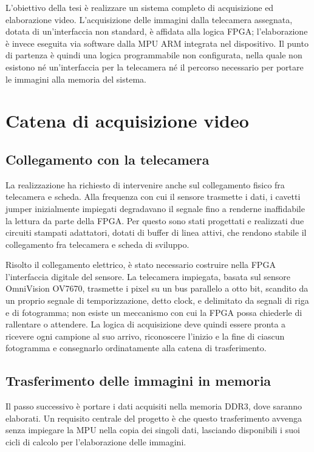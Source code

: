 L'obiettivo della tesi è realizzare un sistema completo di acquisizione ed elaborazione video. L'acquisizione delle immagini dalla telecamera assegnata, dotata di un'interfaccia non standard, è affidata alla logica FPGA; l'elaborazione è invece eseguita via software dalla MPU ARM integrata nel dispositivo. Il punto di partenza è quindi una logica programmabile non configurata, nella quale non esistono né un'interfaccia per la telecamera né il percorso necessario per portare le immagini alla memoria del sistema.

\section{Catena di acquisizione video}

\subsection{Collegamento con la telecamera}

La realizzazione ha richiesto di intervenire anche sul collegamento fisico fra telecamera e scheda. Alla frequenza con cui il sensore trasmette i dati, i cavetti jumper inizialmente impiegati degradavano il segnale fino a renderne inaffidabile la lettura da parte della FPGA. Per questo sono stati progettati e realizzati due circuiti stampati adattatori, dotati di buffer di linea attivi, che rendono stabile il collegamento fra telecamera e scheda di sviluppo.

Risolto il collegamento elettrico, è stato necessario costruire nella FPGA l'interfaccia digitale del sensore. La telecamera impiegata, basata sul sensore OmniVision OV7670, trasmette i pixel su un bus parallelo a otto bit, scandito da un proprio segnale di temporizzazione, detto clock, e delimitato da segnali di riga e di fotogramma; non esiste un meccanismo con cui la FPGA possa chiederle di rallentare o attendere. La logica di acquisizione deve quindi essere pronta a ricevere ogni campione al suo arrivo, riconoscere l'inizio e la fine di ciascun fotogramma e consegnarlo ordinatamente alla catena di trasferimento.

\subsection{Trasferimento delle immagini in memoria}

Il passo successivo è portare i dati acquisiti nella memoria DDR3, dove saranno elaborati. Un requisito centrale del progetto è che questo trasferimento avvenga senza impiegare la MPU nella copia dei singoli dati, lasciando disponibili i suoi cicli di calcolo per l'elaborazione delle immagini.


